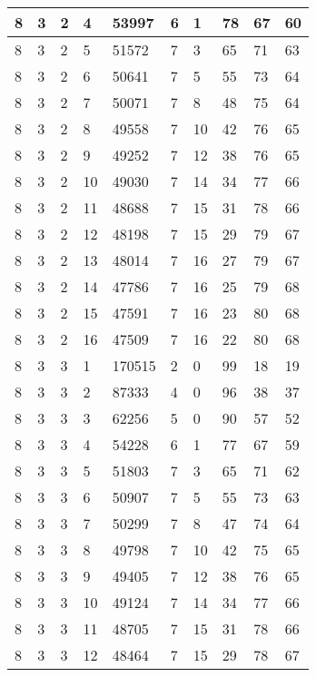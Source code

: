 \begin{table}[!ht]
\begin{tabular}{|l|l|l|l|l|l|l|l|l|l|}
        8 & 3 & 2 & 4 & 53997 & 6 & 1 & 78 & 67 & 60 \\ \hline
        8 & 3 & 2 & 5 & 51572 & 7 & 3 & 65 & 71 & 63 \\ \hline
        8 & 3 & 2 & 6 & 50641 & 7 & 5 & 55 & 73 & 64 \\ \hline
        8 & 3 & 2 & 7 & 50071 & 7 & 8 & 48 & 75 & 64 \\ \hline
        8 & 3 & 2 & 8 & 49558 & 7 & 10 & 42 & 76 & 65 \\ \hline
        8 & 3 & 2 & 9 & 49252 & 7 & 12 & 38 & 76 & 65 \\ \hline
        8 & 3 & 2 & 10 & 49030 & 7 & 14 & 34 & 77 & 66 \\ \hline
        8 & 3 & 2 & 11 & 48688 & 7 & 15 & 31 & 78 & 66 \\ \hline
        8 & 3 & 2 & 12 & 48198 & 7 & 15 & 29 & 79 & 67 \\ \hline
        8 & 3 & 2 & 13 & 48014 & 7 & 16 & 27 & 79 & 67 \\ \hline
        8 & 3 & 2 & 14 & 47786 & 7 & 16 & 25 & 79 & 68 \\ \hline
        8 & 3 & 2 & 15 & 47591 & 7 & 16 & 23 & 80 & 68 \\ \hline
        8 & 3 & 2 & 16 & 47509 & 7 & 16 & 22 & 80 & 68 \\ \hline
        8 & 3 & 3 & 1 & 170515 & 2 & 0 & 99 & 18 & 19 \\ \hline
        8 & 3 & 3 & 2 & 87333 & 4 & 0 & 96 & 38 & 37 \\ \hline
        8 & 3 & 3 & 3 & 62256 & 5 & 0 & 90 & 57 & 52 \\ \hline
        8 & 3 & 3 & 4 & 54228 & 6 & 1 & 77 & 67 & 59 \\ \hline
        8 & 3 & 3 & 5 & 51803 & 7 & 3 & 65 & 71 & 62 \\ \hline
        8 & 3 & 3 & 6 & 50907 & 7 & 5 & 55 & 73 & 63 \\ \hline
        8 & 3 & 3 & 7 & 50299 & 7 & 8 & 47 & 74 & 64 \\ \hline
        8 & 3 & 3 & 8 & 49798 & 7 & 10 & 42 & 75 & 65 \\ \hline
        8 & 3 & 3 & 9 & 49405 & 7 & 12 & 38 & 76 & 65 \\ \hline
        8 & 3 & 3 & 10 & 49124 & 7 & 14 & 34 & 77 & 66 \\ \hline
        8 & 3 & 3 & 11 & 48705 & 7 & 15 & 31 & 78 & 66 \\ \hline
        8 & 3 & 3 & 12 & 48464 & 7 & 15 & 29 & 78 & 67 \\ \hline

\end{tabular}
\end{table}
